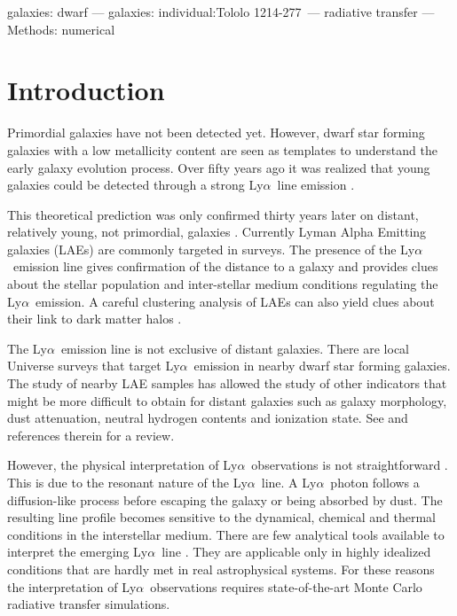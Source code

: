 \documentclass[a4paper,fleqn,usenatbib]{mnras}
\newcommand{\tol}{Tololo 1214-277}
\newcommand{\lya}{\ifmmode{{\rm Ly}\alpha}\else Ly$\alpha$\ \fi}
\begin{document}
\begin{keywords}
galaxies: dwarf --- galaxies: individual:\tol\ --- radiative transfer --- Methods: numerical 
\end{keywords}



\section{Introduction}
\label{sec:introduction}

Primordial galaxies have not been detected yet. 
However, dwarf star forming galaxies with a low metallicity content
are seen as templates to understand the early galaxy evolution process. 
Over fifty years ago it was realized that young galaxies could be
detected through a strong \lya line emission \citep{PartridgePeebles}.    

This theoretical prediction was only confirmed thirty years later on
distant, relatively young, not primordial, galaxies \citep{1998ApJ...498L..93D}.
Currently Lyman Alpha Emitting galaxies (LAEs) are commonly targeted
in surveys. 
The presence of the \lya emission line gives confirmation of
the distance to a galaxy and provides clues about the stellar
population and inter-stellar medium conditions regulating the
\lya emission.
A careful clustering analysis of LAEs can also yield clues about their link
to dark matter halos
\citep{2004AJ....128.2073H,2007ApJ...671..278G,2007ApJ...668...15K,2008MNRAS.391.1589O,2010MNRAS.409..184P,2013MNRAS.431.1777G,2016ApJ...828....5M}. 

The \lya emission line is not exclusive of distant galaxies. 
There are local Universe surveys that target \lya emission in nearby
dwarf star forming galaxies.
The study of nearby LAE samples has allowed the study of other
indicators that might be more difficult to obtain for distant galaxies
such as galaxy morphology, dust attenuation, neutral hydrogen contents and
ionization state. See \cite{Hayes15} and references therein for a review.

However, the physical interpretation of \lya observations is
not straightforward \citep{LARS,2015ApJ...805...14R}. 
This is due to the resonant nature of the \lya line. 
A \lya photon follows a diffusion-like process before escaping
the galaxy or being absorbed by dust. 
The resulting line profile becomes sensitive to the dynamical, chemical
and thermal conditions in the interstellar medium. 
There are few analytical tools available to interpret the
emerging \lya line
\citep{Harrington73,1991ApJ...370L..85N,LoebRybicki,2006ApJ...649...14D,2006ApJ...645..792T}. 
They are applicable only in highly idealized conditions that
are hardly met in real astrophysical systems. 
For these reasons the interpretation of \lya observations
requires state-of-the-art Monte Carlo radiative transfer simulations.   
\end{document}
